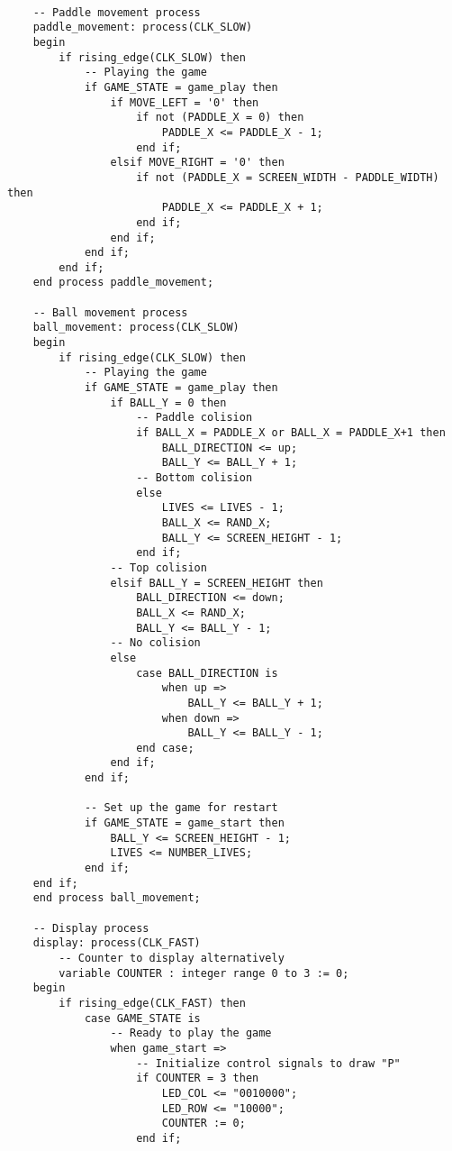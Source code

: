 \begin{verbatim}
    
    -- Paddle movement process
    paddle_movement: process(CLK_SLOW)
    begin
        if rising_edge(CLK_SLOW) then
            -- Playing the game
            if GAME_STATE = game_play then
                if MOVE_LEFT = '0' then
                    if not (PADDLE_X = 0) then
                        PADDLE_X <= PADDLE_X - 1;
                    end if;
                elsif MOVE_RIGHT = '0' then
                    if not (PADDLE_X = SCREEN_WIDTH - PADDLE_WIDTH) then
                        PADDLE_X <= PADDLE_X + 1;
                    end if;
                end if;
            end if;
        end if;
    end process paddle_movement;

    -- Ball movement process
    ball_movement: process(CLK_SLOW)
    begin
        if rising_edge(CLK_SLOW) then
            -- Playing the game
            if GAME_STATE = game_play then
                if BALL_Y = 0 then
                    -- Paddle colision
                    if BALL_X = PADDLE_X or BALL_X = PADDLE_X+1 then
                        BALL_DIRECTION <= up;
                        BALL_Y <= BALL_Y + 1;
                    -- Bottom colision
                    else
                        LIVES <= LIVES - 1;
                        BALL_X <= RAND_X;
                        BALL_Y <= SCREEN_HEIGHT - 1;
                    end if;
                -- Top colision
                elsif BALL_Y = SCREEN_HEIGHT then
                    BALL_DIRECTION <= down;
                    BALL_X <= RAND_X;
                    BALL_Y <= BALL_Y - 1;
                -- No colision
                else
                    case BALL_DIRECTION is
                        when up =>
                            BALL_Y <= BALL_Y + 1;
                        when down =>
                            BALL_Y <= BALL_Y - 1;
                    end case;
                end if;
            end if;

            -- Set up the game for restart
            if GAME_STATE = game_start then
                BALL_Y <= SCREEN_HEIGHT - 1;
                LIVES <= NUMBER_LIVES;
            end if;
	end if;
    end process ball_movement;

    -- Display process
    display: process(CLK_FAST)
        -- Counter to display alternatively
        variable COUNTER : integer range 0 to 3 := 0;
    begin
        if rising_edge(CLK_FAST) then
            case GAME_STATE is
                -- Ready to play the game
                when game_start =>
                    -- Initialize control signals to draw "P"
                    if COUNTER = 3 then
                        LED_COL <= "0010000";
                        LED_ROW <= "10000";
                        COUNTER := 0;
                    end if;
                      

\end{verbatim}
